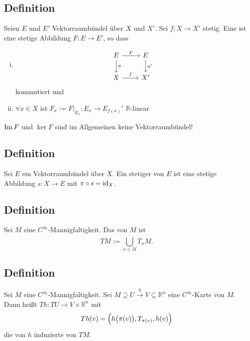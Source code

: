 \subsection[Definition: Lineare Abbildung über $f$]{Definition} %
\label{sub:193}
Seien $E$ und $E'$ Vektorraumbündel über $X$ und $X'$. Sei $f : X \to X'$ stetig. Eine  ist eine stetige Abbildung $F : E \to E'$,
so dass 
\begin{enumerate}[(i)]
	\item \[
		\begin{tikzcd}
			E \rar["F"] \dar["\pi"] & E  \dar["\pi'"]\\
			X \rar["f"] & X'
		\end{tikzcd}
	\]
	kommutiert und
	\item $\forall x \in X$ ist $F_x := F \big|_{E_x} : E_x \to E_{f(x)}'$ $\mathds{R}$-linear
\end{enumerate}
$\im F$ und $\ker F$ sind im Allgemeinen keine Vektorraumbündel!

\subsection[Definition: Schnitt]{Definition} %
\label{sub:194}
Sei $E$ ein Vektorraumbündel über $X$. Ein stetiger  von $E$ ist eine stetige Abbildung $s : X \to E$ mit $\pi \circ s = \id_X$.

\subsection[Definition: Tangentialbündel]{Definition} %
\label{sub:195}
Sei $M$ eine $C^\infty$-Mannigfaltigkeit. Das  von $M$ ist 
\[
	T M := \bigcup_{x \in M}^{.} T_x M.
\]

\subsection[Definition: Bündelkarte]{Definition} %
\label{sub:196}
Sei $M$ eine $C^\infty$-Mannigfaltigkeit. Sei $M \supseteq U \xrightarrow{\, h \,} V \subseteq \mathds{R}^n$ eine $C^\infty$-Karte von $M$. Dann heißt 
$T h : T U \to V \times \mathds{R}^n$ mit 
\[
	T h (v) = \enbrace[\Big]{h \enbrace[\big]{\pi(v)}, T_{\pi(v)}, h (v)}  
\]
die von $h$ induzierte  von $T M$. 

